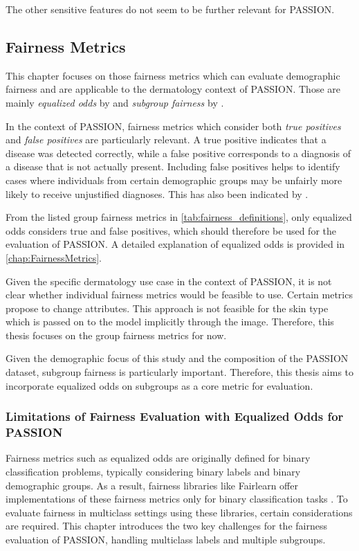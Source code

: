 \documentclass[12pt, a4paper, oneside]{book}   	%
\renewcommand{\paragraph}[1]{%
	\subsubsection*{#1}%
}
\begin{document}
			The other sensitive features do not seem to be further relevant for PASSION.
		
		\subsection{Fairness Metrics} \label{chap:ContextFairnessMetrics}
		This chapter focuses on those fairness metrics which can evaluate demographic fairness and are applicable to the dermatology context of PASSION.	Those are mainly \textit{equalized odds} by \textcite{M63_Hardt_2016} and \textit{subgroup fairness} by \textcite{M79_Kearns_2018}.
		
		In the context of PASSION, fairness metrics which consider both \textit{true positives} and \textit{false positives} are particularly relevant. A true positive indicates that a disease was detected correctly, while a false positive corresponds to a diagnosis of a disease that is not actually present. Including false positives helps to identify cases where individuals from certain demographic groups may be unfairly more likely to receive unjustified diagnoses. This has also been indicated by \textcite{Sabato_2024}.
		
		From the listed group fairness metrics in \autoref{tab:fairness_definitions}, only equalized odds considers true and false positives, which should therefore be used for the evaluation of PASSION. A detailed explanation of equalized odds is provided in \autoref{chap:FairnessMetrics}.
		
		Given the specific dermatology use case in the context of PASSION, it is not clear whether individual fairness metrics would be feasible to use. Certain metrics propose to change attributes. This approach is not feasible for the skin type which is passed on to the model implicitly through the image. Therefore, this thesis focuses on the group fairness metrics for now.
		
		Given the demographic focus of this study and the composition of the PASSION dataset, subgroup fairness is particularly important. Therefore, this thesis aims to incorporate equalized odds on subgroups as a core metric for evaluation.
		
		\paragraph{Limitations of Fairness Evaluation with Equalized Odds for PASSION}
		Fairness metrics such as equalized odds are originally defined for binary classification problems, typically considering binary labels and binary demographic groups. As a result, fairness libraries like \gls{Fairlearn} offer implementations of these fairness metrics only for binary classification tasks \autocite{Fairlearn_nodate}. To evaluate fairness in multiclass settings using these libraries, certain considerations are required. This chapter introduces the two key challenges for the fairness evaluation of PASSION, handling multiclass labels and multiple subgroups.
		
\end{document}
